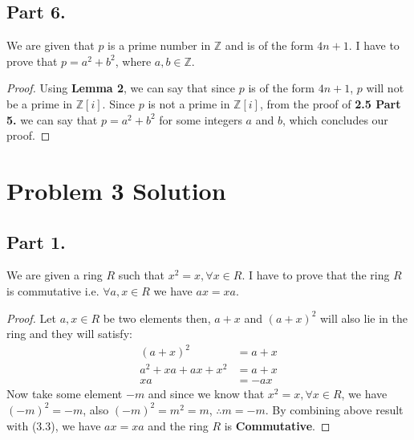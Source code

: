 \documentclass{article}
\begin{document}
{  \subsection{Part 6.}{
    We are given that $p$ is a prime number in $\mathbb{Z}$ and is of the form $4n+1$. \newline
    I have to prove that $p=a^2+b^2$, where $a,b \in \mathbb{Z}$.
    \begin{proof}
      Using \textbf{Lemma 2}, we can say that since $p$ is of the form $4n+1$, $p$ will not be a prime in $\mathbb{Z}[i]$. \newline
      Since $p$ is not a prime in $\mathbb{Z}[i]$, from the proof of \textbf{2.5 Part 5.} we can say that $p=a^2+b^2$ for some integers $a$ and $b$, which concludes our proof.
    \end{proof}
  }
}
\newpage
\section{Problem 3 Solution}{
  \subsection{Part 1.}{
    We are given a ring $R$ such that $x^2=x,\forall x \in R$. \newline
    I have to prove that the ring $R$ is commutative i.e. $\forall a,x \in R$ we have $ax=xa$.
    \begin{proof}
      Let $a,x \in R$ be two elements then, $a+x$ and $(a+x)^2$ will also lie in the ring and they will satisfy:
      \begin{align}
        (a+x)^2&=a+x \label{eq:1} \\
        a^2+xa+ax+x^2&=a+x \\
        xa&=-ax
      \end{align}
      Now take some element $-m$ and since we know that $x^2=x, \forall x \in R$, we have $(-m)^2=-m$, also $(-m)^2=m^2=m$, $\therefore m=-m$. \newline
      By combining above result with (3.3), we have $ax=xa$ and the ring $R$ is \textbf{Commutative}.
    \end{proof}
  }
}
\end{document}
